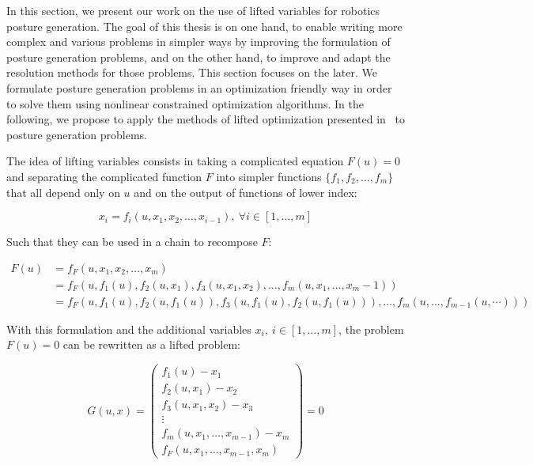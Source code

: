 In this section, we present our work on the use of lifted variables for robotics posture generation.
The goal of this thesis is on one hand, to enable writing more complex and various problems in simpler ways by improving the formulation of posture generation problems, and on the other hand, to improve and adapt the resolution methods for those problems.
This section focuses on the later.
We formulate posture generation problems in an optimization friendly way in order to solve them using nonlinear constrained optimization algorithms.
In the following, we propose to apply the methods of lifted optimization presented in~\cite{Albersmeyer:2010:LNM:1958447.1958472} to posture generation problems.

The idea of lifting variables consists in taking a complicated equation $F(u) = 0$ and separating the complicated function $F$ into simpler functions $\{f_1, f_2, \ldots, f_m\}$ that all depend only on $u$ and on the output of functions of lower index:

\begin{equation}
  x_i = f_i(u, x_1, x_2, \ldots,x_{i-1}),\ \forall i\in[1,\ldots, m]
\end{equation}

Such that they can be used in a chain to recompose $F$:

\begin{align}
  F(u) &= f_F\left(u, x_1, x_2, \ldots, x_m\right)\\
       &= f_F\left(u, f_1(u), f_2(u,x_1), f_3(u,x_1,x_2), \ldots, f_m(u, x_1, \ldots, x_m-1)\right) \\
       &= f_F\left(u, f_1(u), f_2(u,f_1(u)), f_3(u,f_1(u),f_2(u,f_1(u))), \ldots, f_m(u, \ldots, f_{m-1}(u,\cdots))\right)
\end{align}

With this formulation and the additional variables $x_i,\ i\in[1,\ldots, m]$, the problem $F(u) = 0$ can be rewritten as a lifted problem:

\begin{equation}
  G(u,x) =
  \begin{pmatrix}
  f_1(u) - x_1 \\
  f_2(u,x_1) - x_2 \\
  f_3(u,x_1,x_2) - x_3 \\
  \vdots \\
  f_m(u,x_1,\ldots, x_{m-1}) - x_m \\
  f_F(u,x_1,\ldots, x_{m-1}, x_m)
  \end{pmatrix}
  =0
\end{equation}

